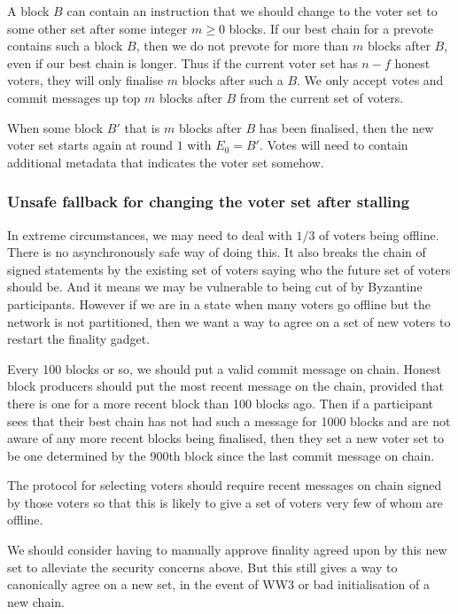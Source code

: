 \documentclass{article}
\begin{document}
A block $B$ can contain an instruction that we should change to the voter set to some other set after some integer $m \geq 0$ blocks. If our best chain for a prevote contains such a block $B$, then we do not prevote for more than $m$ blocks after $B$, even if our best chain is longer.
Thus if the current voter set has $n-f$ honest voters, they will only finalise $m$ blocks after such a $B$. We only accept votes and commit messages up top $m$ blocks after $B$ from the current set of voters.  

When some block $B'$ that is $m$ blocks after $B$ has been finalised, then the new voter set starts again at round $1$ with $E_{0}=B'$. Votes will need to contain additional metadata that indicates the voter set somehow.

\subsubsection{Unsafe fallback for changing the voter set after stalling}

In extreme circumstances, we may need to deal with $1/3$ of voters being offline.
There is no asynchronously safe way of doing this. It also breaks the chain of signed statements by the existing set of voters saying who the future set of voters should be. And it means we may be vulnerable to being cut of by Byzantine participants.
However if we are in a state when many voters go offline but the network is not partitioned, then we want a way to agree on a set of new voters to restart the finality gadget.

Every 100 blocks or so, we should put a valid commit message on chain. Honest block producers should put the most recent message on the chain, provided that there is one for a more recent block than 100 blocks ago.
Then if a participant sees that their best chain has not had such a message for 1000 blocks and are not aware of any more recent blocks being finalised, then they set a new voter set to be one determined by the 900th block since the last commit message on chain. 

The protocol for selecting voters should require recent messages on chain signed by those voters so that this is likely to give a set of voters very few of whom are offline.

We should consider having to manually approve finality agreed upon by this new set to alleviate the security concerns above. But this still gives a way to canonically agree on a new set, in the event of WW3 or bad initialisation of a new chain.
\end{document}
